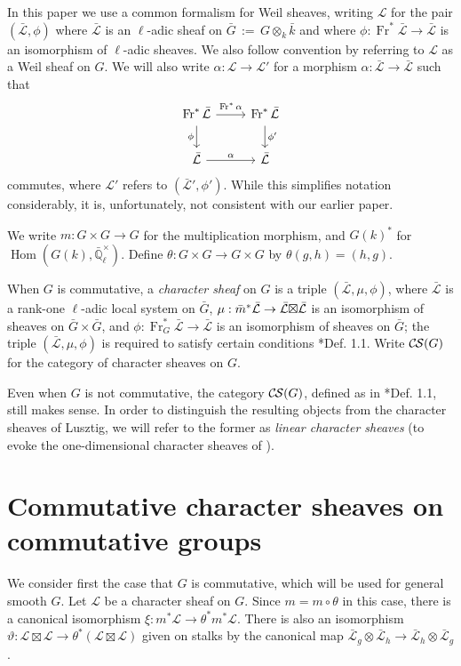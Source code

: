 \documentclass[10pt]{amsart}
\theoremstyle{plain}
\theoremstyle{definition}
\newcommand{\EE}{\mathbb{\bar Q}_\ell}
\newcommand{\bFq}{\bar{k}}
\newcommand{\Fq}{k}
\newcommand{\EEx}{\EE^\times}
\newcommand{\Frob}[1]{\operatorname{Fr}_{#1}}
\DeclareMathOperator{\Hom}{Hom}
\newcommand{\ceq}{{\, :=\, }}
\newcommand{\cs}[1]{{\mathcal{#1}}}
\newcommand{\gcs}[1]{{\mathcal{\bar #1}}}
\newcommand{\CS}{{\mathcal{C\hskip-0.8pt S}}}
\newcommand{\bm}{\bar{m}}
\newcommand{\bG}{\bar{G}}
\newcommand{\tight}[3]{\hspace{-#1pt}{#2}\hspace{-#3pt}}
\newcommand{\LxL}{\text{$\gcs{L} \tight{0}{\boxtimes}{0} \gcs{L}$}}
\begin{document}
In this paper we use a common formalism for Weil sheaves, writing $\cs{L}$ for the pair $(\gcs{L},\phi)$ where $\gcs{L}$ is an $\ell$-adic sheaf on $\bG \ceq G\otimes_{\Fq} \bFq$ and where $\phi : \Frob{}^*\gcs{L} \to \gcs{L}$ is an isomorphism of $\ell$-adic sheaves. 
We also follow convention by referring to $\cs{L}$  as a Weil sheaf on $G$. 
We will also write $\alpha : \cs{L} \to \cs{L}'$ for a morphism $\alpha : \gcs{L} \to \gcs{L}$ such that 
\[
\begin{tikzcd}
\Frob{}^* \gcs{L} \arrow{d}[swap]{\phi} \arrow{r}{\Frob{}^*\alpha} &  \Frob{}^* \gcs{L} \arrow{d}{\phi'}\\
\gcs{L} \arrow{r}{\alpha} & \gcs{L}
\end{tikzcd}
\]
commutes, where $\cs{L}'$ refers to $(\gcs{L}',\phi')$.
While this simplifies notation considerably, it is, unfortunately, not consistent with our earlier paper.

We write $m : G \times G \to G$ for the multiplication morphism, and $G(k)^*$ for $\Hom(G(k), \EEx)$.
Define $\theta : G\times G \to G\times G$ by $\theta(g,h) = (h,g)$.

When $G$ is commutative, a \emph{character sheaf} on $G$ is a triple $(\gcs{L}, \mu, \phi)$,
where $\gcs{L}$ is a rank-one $\ell$-adic local system on $\bG$, 
$\mu : \bm^* \gcs{L} \to \LxL$ is an isomorphism
of sheaves on $\bG \times \bG$, 
and $\phi : \Frob{G}^* \gcs{L} \to \gcs{L}$ is an isomorphism of sheaves on $\bG$;
the triple $(\gcs{L}, \mu, \phi)$ is required to satisfy certain conditions \cite{cunningham-roe:13a}*{Def. 1.1}.
Write $\CS(G)$ for the category of character sheaves on $G$.

Even when $G$ is not commutative, the category $\CS(G)$, defined as in \cite{cunningham-roe:13a}*{Def. 1.1},
still makes sense.  In order to distinguish the resulting objects from
the character sheaves of Lusztig, we will refer to the former as \emph{linear character sheaves}
(to evoke the one-dimensional character sheaves of \cite{kamgarpour:09a}).

\section{Commutative character sheaves on commutative groups}\label{sec:comcom}

We consider first the case that $G$ is commutative, which will be used for general smooth $G$.
Let $\cs{L}$ be a character sheaf on $G$.  Since $m = m \circ \theta$ in this case,
there is a canonical isomorphism $\xi : m^* \cs{L} \to \theta^* m^* \cs{L}$.
There is also an isomorphism $\vartheta : \cs{L}\boxtimes\cs{L} \to \theta^*(\cs{L}\boxtimes\cs{L})$
given on stalks by the canonical map $\gcs{L}_{g} \otimes \gcs{L}_{h} \to \gcs{L}_{h} \otimes \gcs{L}_{g}$.
\end{document}
